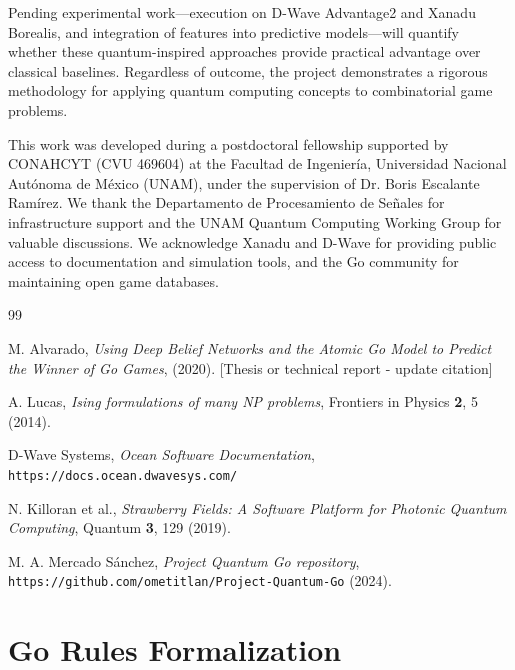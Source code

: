 \documentclass[aps,prl,reprint]{revtex4-2}
\begin{document}
Pending experimental work—execution on D-Wave Advantage2 and Xanadu Borealis, and integration of features into predictive models—will quantify whether these quantum-inspired approaches provide practical advantage over classical baselines. Regardless of outcome, the project demonstrates a rigorous methodology for applying quantum computing concepts to combinatorial game problems.

\begin{acknowledgments}
This work was developed during a postdoctoral fellowship supported by CONAHCYT (CVU 469604) at the Facultad de Ingeniería, Universidad Nacional Autónoma de México (UNAM), under the supervision of Dr. Boris Escalante Ramírez. We thank the Departamento de Procesamiento de Señales for infrastructure support and the UNAM Quantum Computing Working Group for valuable discussions. We acknowledge Xanadu and D-Wave for providing public access to documentation and simulation tools, and the Go community for maintaining open game databases.
\end{acknowledgments}

\begin{thebibliography}{99}
	
	M. Alvarado,
	\textit{Using Deep Belief Networks and the Atomic Go Model to Predict the Winner of Go Games},
	(2020). [Thesis or technical report - update citation]
	
	A. Lucas,
	\textit{Ising formulations of many NP problems},
	Frontiers in Physics \textbf{2}, 5 (2014).
	
	D-Wave Systems,
	\textit{Ocean Software Documentation},
	\texttt{https://docs.ocean.dwavesys.com/}
	
	N. Killoran et al.,
	\textit{Strawberry Fields: A Software Platform for Photonic Quantum Computing},
	Quantum \textbf{3}, 129 (2019).
	
	M. A. Mercado Sánchez,
	\textit{Project Quantum Go repository},
	\texttt{https://github.com/ometitlan/Project-Quantum-Go} (2024).
	
\end{thebibliography}

\appendix

\section{Go Rules Formalization}
\label{app:rules}
\end{document}
